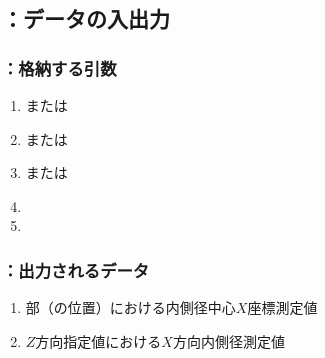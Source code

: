 \subsection{\MXIWidth：データの入出力}

\subsubsection{\MXIWidth：格納する引数}
\begin{enumerate}[label*=\sarrow]
\item \PMTopEndACID または\PMBottomEndACID
\item \PMTopReAlocationLength または\PMBottomReAlocationLength
\item \PMTopAlocationLength または\PMBottomAlocationLength
\item \PMCenterCurvatureRadius
\item \PMPlatingThk
\end{enumerate}

\subsubsection{\MXIWidth：出力されるデータ}
\begin{enumerate}[label*=\sarrow]
\item \EndFace 部（\ReAlocationLength の位置）における内側径中心$X$座標測定値
\item $Z$方向指定値における$X$方向内側径測定値
\end{enumerate}

